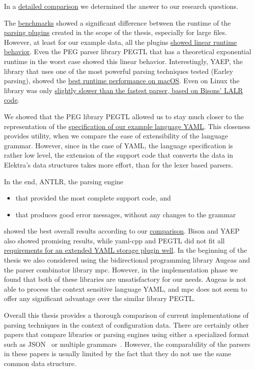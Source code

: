 In a \hyperref[sec:comparison]{detailed comparison} we determined the answer to our research questions.

\speed*

The \hyperref[sec:run_time_performance]{benchmarks} showed a significant difference between the runtime of the \hyperref[sec:implementation]{parsing plugins} created in the scope of the thesis, especially for large files. However, at least for our example data, all the plugins \hyperref[fig:benchmark_results_generated_above_1000]{showed linear runtime behavior}. Even the PEG parser library \gls{PEGTL} that has a theoretical exponential runtime in the worst case showed this linear behavior. Interestingly, \gls{YAEP}, the library that uses one of the most powerful parsing techniques tested (Earley parsing), showed the \hyperref[fig:benchmark_generated]{best runtime performance on macOS}. Even on Linux the library was only \hyperref[fig:benchmark_generated]{slightly slower than the fastest parser, based on Bisons’ LALR code}.

\closeness*

We showed that the \gls{PEG} library \gls{PEGTL} allowed us to stay much closer to the representation of the \href{http://yaml.org/spec/1.2/spec.html}{specification of our example language YAML}. This closeness provides utility, when we compare the ease of extensibility of the language grammar. However, since in the case of YAML, the language specification is rather low level, the extension of the support code that converts the data in Elektra’s data structures takes more effort, than for the lexer based parsers.

In the end, \gls{ANTLR}, the parsing engine

\begin{itemize}
  \item that provided the most complete support code, and
  \item that produces good error messages, without any changes to the grammar
\end{itemize}

showed the best overall results according to our \hyperref[sec:comparison]{comparison}. Bison and \gls{YAEP} also showed promising results, while yaml-cpp and PEGTL did not fit all \hyperref[sec:requirements_extended_yaml_plugin]{requirements for an extended YAML storage plugin well}. In the beginning of the thesis we also considered using the bidirectional programming library Augeas and the parser combinator library mpc. However, in the implementation phase we found that both of these libraries are unsatisfactory for our needs. Augeas is not able to process the context sensitive language YAML, and mpc does not seem to offer any significant advantage over the similar library \gls{PEGTL}.

Overall this thesis provides a thorough comparison of current implementations of parsing techniques in the context of configuration data. There are certainly other papers that compare libraries or parsing engines using either a specialized format such as JSON~\cite{json2019geoff} or multiple grammars~\cite{chen2011full, flodin2014packrat}. However, the comparability of the parsers in these papers is usually limited by the fact that they do not use the same common data structure.

